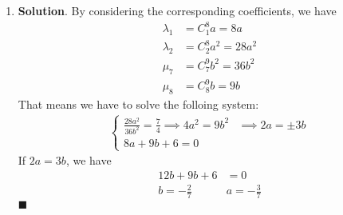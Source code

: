 \documentclass[12pt]{article}
\newenvironment*{sol}{\par \textbf{Solution}.}{\hfill$\blacksquare$}
\begin{document}
\begin{enumerate}
\begin{enumerate}
\begin{sol}
                Thus, by the principle of Mathematical Induction, $P(n)$ is true for all positive integer $n$.
            \end{sol}
            \item \begin{sol}
                \begin{align*}
                    \sum_{n=1}^{2m}A_n&=\sum_{n=1}^{2m}(-1)^{n-1}B_n\\
                    &=\sum_{n=1}^{m}(B_{2n-1}-B_{2n})\\
                    &=\sum_{n=1}^{m}(-2n)\\
                    &=-2\sum_{n=1}^{m}n\\
                    &=-2 B_m\\
                    &=-m(m+1)\\
                    \sum_{n=1}^{2m+1}A_n&=-m(m+1)+A_{2m+1}\\
                    &=-m(m+1)+B_{2m+1}\\
                    &=-m(m+1)+(m+1)(2m+1)\\
                    &=(m+1)^2
                \end{align*}
            \end{sol}
        \end{enumerate}
        \item \begin{sol}
            By considering the corresponding coefficients, we have
            \begin{align*}
                \lambda_1&=C_1^8a=8a\\
                \lambda_2&=C_2^8a^2=28a^2\\
                \mu_7&=C_7^9b^2=36b^2\\
                \mu_8&=C_8^9b=9b
            \end{align*}
            That means we have to solve the folloing system:\begin{align*}
                \begin{cases}
                    \frac{28a^2}{36b^2}=\frac{7}{4}\implies 4a^2=9b^2&\implies 2a=\pm 3b\\
                    8a+9b+6=0
                \end{cases}
            \end{align*}
            If $2a=3b$, we have \begin{align*}
                12b+9b+6&=0\\
                b=-\frac{2}{7} &a=-\frac{3}{7}

\end{align*}
\end{sol}
\end{enumerate}
\end{document}
